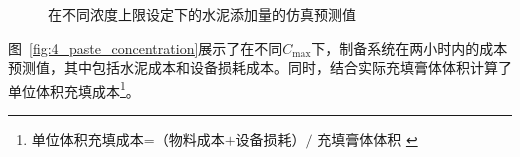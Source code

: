 \begin{figure}[h]
\centering
{} \hspace{-0.1in}
 \hspace{-0.1in}
 \hspace{-0.1in}
\caption{在不同浓度上限设定下的水泥添加量的仿真预测值}
\label{fig:paste_bound_simulation}
\end{figure}

图~\ref{fig:4_paste_concentration}展示了在不同$C_{\max}$下，制备系统在两小时内的成本预测值，其中包括水泥成本和设备损耗成本。同时，结合实际充填膏体体积计算了单位体积充填成本\footnote{单位体积充填成本\text{ }=${\text {（物料成本+设备损耗）}}/{\text { 充填膏体体积 }}$}。

